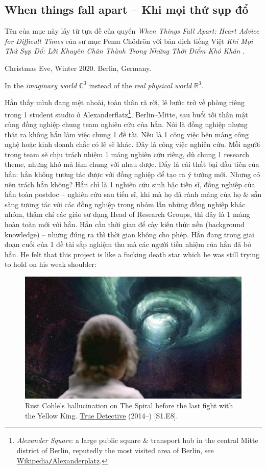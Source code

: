 \documentclass[12pt]{article}
\begin{document}
\subsection{When things fall apart -- Khi mọi thứ sụp đổ}
Tên của mục này lấy từ tựa đề của quyển {\it When Things Fall Apart: Heart Advice for Difficult Times} \cite{Chodron2002} của sư mục {\sc Pema Ch\"odr\"on} với bản dịch tiếng Việt {\it Khi Mọi Thứ Sụp Đổ: Lời Khuyên Chân Thành Trong Những Thời Điểm Khó Khăn} \cite{Chodron2021}.
\begin{flushright}
	Christmas Eve, Winter 2020. Berlin, Germany.
	
	In the {\it imaginary world} $\mathbb{C}^3$ instead of the {\it real physical world} $\mathbb{R}^3$.
\end{flushright}
Hắn thấy mình đang mệt nhoài, toàn thân rã rời, lê bước trở về phòng riêng trong 1 student studio ở Alexanderflatz\footnote{ {\it Alexander Square}: a large public square \& transport hub in the central Mitte district of Berlin, reputedly the most visited area of Berlin, see \href{https://en.wikipedia.org/wiki/Alexanderplatz}{Wikipedia{\tt/}Alexanderplatz}.}, Berlin--Mitte, sau buổi tối thân mật cùng đồng nghiệp chung team nghiên cứu của hắn. Nói là đồng nghiệp nhưng thật ra không hắn làm việc chung 1 đề tài. Nếu là 1 công việc bên mảng công nghệ hoặc kinh doanh chắc có lẽ sẽ khác. Đây là công việc nghiên cứu. Mỗi người trong team sẽ chịu trách nhiệm 1 mảng nghiên cứu riêng, dù chung 1 research theme, nhưng khó mà làm chung với nhau được. Đấy là cái thất bại đầu tiên của hắn: hắn không tương tác được với đồng nghiệp để tạo ra ý tưởng mới. Nhưng có nên trách hắn không? Hắn chỉ là 1 nghiên cứu sinh bậc tiến sĩ, đồng nghiệp của hắn toàn postdoc -- nghiên cứu sau tiến sĩ, khi mà họ đã rành mảng của họ \& sẵn sàng tương tác với các đồng nghiệp trong nhóm lẫn những đồng nghiệp khác nhóm, thậm chí các giáo sư dạng Head of Research Groups, thì đây là 1 mảng hoàn toàn mới với hắn. Hắn cần thời gian để cày kiến thức nền (background knowledge) -- nhưng đúng ra thì thời gian không cho phép. Hắn đang trong giai đoạn cuối của 1 đề tài sắp nghiệm thu mà các người tiền nhiệm của hắn đã bỏ hẳn. He felt that this project is like a fucking death star which he was still trying to hold on his weak shoulder:
\begin{figure}[H]
	\centering
	\includegraphics[scale=.7]{spiral}
	\caption{Rust Cohle's hallucination on The Spiral before the last fight with the Yellow King. \href{https://www.imdb.com/title/tt2356777/}{True Detective} (2014--) [S1.E8].}
\end{figure}
\end{document}
